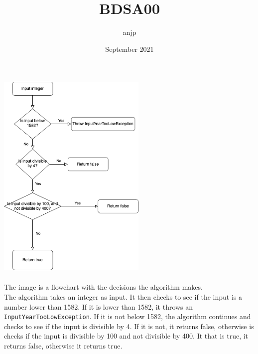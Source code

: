 \documentclass{article}
\title{BDSA00}
\author{anjp }
\date{September 2021}
\begin{document}
\includegraphics[height=10cm]{IsLeapYearFlow.drawio.png}
\\\\
The image is a flowchart with the decisions the algorithm makes. \\
The algorithm takes an integer as input. It then checks to see if the input is a number lower than 1582. If it is lower than 1582, it throws an \texttt{InputYearTooLowException}.
If it is not below 1582, the algorithm continues and checks to see if the input is divisible by 4. If it is not, it returns false, otherwise is checks if the input is divisible by 100 and not divisible by 400. It that is true, it returns false, otherwise it returns true.
\end{document}
